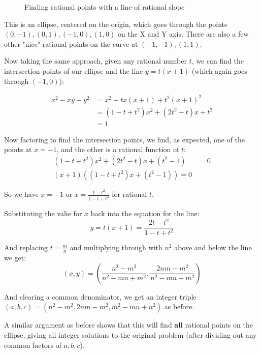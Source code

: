 \documentclass{article}
\begin{document}
\begin{figure}[htb]
        \caption{Finding rational points with a line of rational slope}
        \label{fig:eisen_ellipse}
\end{figure}

This is an ellipse, centered on the origin, which goes through the points $(0,-1), (0,1), (-1,0), (1,0)$
on the X and Y axis. There are also a few other "nice" rational points on the curve at $(-1,-1), (1,1)$.

Now taking the same approach, given any rational number $t$, we can find the intersection points of our
ellipse and the line $y = t(x+1)$ (which again goes through $(-1,0)$):

\begin{equation*}
        \begin{split}
		x^2 - xy + y^2 & = x^2 - tx(x+1)+t^2(x+1)^2 \\
		&= (1-t+t^2)x^2 +(2t^2-t)x + t^2 \\
		&= 1 
	\end{split}
\end{equation*}

Now factoring to find the intersection points, we find, as expected, one of the points at $x=-1$, and
the other is a rational function of $t$:
\begin{equation*}
	\begin{split}
		(1-t+t^2)x^2 + (2t^2-t)x + (t^2-1) &= 0 \\
		(x + 1)((1-t+t^2)x + (t^2 - 1)) = 0
        \end{split}
\end{equation*}

So we have $x = -1$ or $x = \frac{1 - t^2}{1-t+t^2}$ for rational $t$.

Substituting the valie for $x$ back into the equation for the line:
\[ y = t(x+1) = \frac{2t - t^2}{1-t+t^2} \]

And replacing $t = \frac{m}{n}$ and multiplying through with $n^2$ above and below the line we get:
\[(x,y) = \left(\frac{n^2-m^2}{n^2-mn+m^2}, \frac{2nm - m^2}{n^2-mn+ m^2}\right) \]

And clearing a common denominator, we get an integer triple
$(a,b,c) = (n^2 - m^2, 2nm - m^2, m^2 - mn + n^2)$ as before.

A similar argument as before shows that this will find \textbf{all} rational points on the
ellipse, giving all integer solutions to the original problem (after dividing out any common factors
of $a, b, c$).
\end{document}
